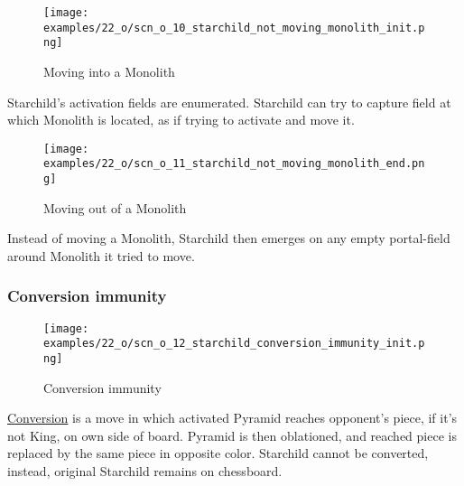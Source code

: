 \vspace*{-0.9\baselineskip}
\noindent
\begin{wrapfigure}[5]{l}{0.4\textwidth}
\centering
\texttt{[image: examples/22\_o/scn\_o\_10\_starchild\_not\_moving\_monolith\_init.png]}
\caption{Moving into a Monolith}
\label{fig:scn_o_10_starchild_not_moving_monolith_init}
\end{wrapfigure}
Starchild’s activation fields are enumerated. Starchild can try to capture field at which
Monolith is located, as if trying to activate and move it.

\vspace*{2.1\baselineskip}
\noindent
\begin{wrapfigure}[4]{l}{0.4\textwidth}
\centering
\texttt{[image: examples/22\_o/scn\_o\_11\_starchild\_not\_moving\_monolith\_end.png]}
\caption{Moving out of a Monolith}
\label{fig:scn_o_11_starchild_not_moving_monolith_end}
\end{wrapfigure}
Instead of moving a Monolith, Starchild then emerges on any empty portal-field around Monolith
it tried to move.

\clearpage %

\subsubsection*{Conversion immunity}

\vspace*{-0.9\baselineskip}
\noindent
\begin{figure}[!h]
\texttt{[image: examples/22\_o/scn\_o\_12\_starchild\_conversion\_immunity\_init.png]}
\caption{Conversion immunity}
\label{fig:scn_o_12_starchild_conversion_immunity_init}
\end{figure}

\hyperref[sec:Mayan Ascendancy/Pyramid/Conversion]{Conversion} is a move in which activated
Pyramid reaches opponent's piece, if it's not King, on own side of board. Pyramid is then
oblationed, and reached piece is replaced by the same piece in opposite color.
Starchild cannot be converted, instead, original Starchild remains on chessboard.

